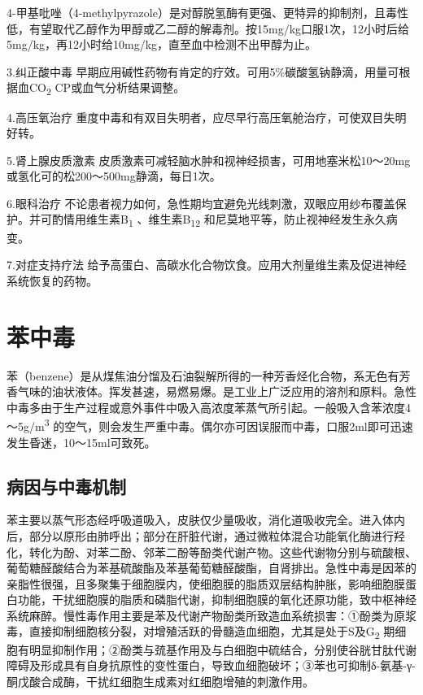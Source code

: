 4-甲基吡唑（4-methylpyrazole）是对醇脱氢酶有更强、更特异的抑制剂，且毒性低，有望取代乙醇作为甲醇或乙二醇的解毒剂。按15mg/kg口服1次，12小时后给5mg/kg，再12小时给10mg/kg，直至血中检测不出甲醇为止。

3.纠正酸中毒
早期应用碱性药物有肯定的疗效。可用5\%碳酸氢钠静滴，用量可根据血CO\textsubscript{2}
CP或血气分析结果调整。

4.高压氧治疗
重度中毒和有双目失明者，应尽早行高压氧舱治疗，可使双目失明好转。

5.肾上腺皮质激素
皮质激素可减轻脑水肿和视神经损害，可用地塞米松10～20mg或氢化可的松200～500mg静滴，每日1次。

6.眼科治疗
不论患者视力如何，急性期均宜避免光线刺激，双眼应用纱布覆盖保护。并可酌情用维生素B\textsubscript{1}
、维生素B\textsubscript{12} 和尼莫地平等，防止视神经发生永久病变。

7.对症支持疗法
给予高蛋白、高碳水化合物饮食。应用大剂量维生素及促进神经系统恢复的药物。

\protect\hypertarget{text00153.html}{}{}

\section{苯中毒}

苯（benzene）是从煤焦油分馏及石油裂解所得的一种芳香烃化合物，系无色有芳香气味的油状液体。挥发甚速，易燃易爆。是工业上广泛应用的溶剂和原料。急性中毒多由于生产过程或意外事件中吸入高浓度苯蒸气所引起。一般吸入含苯浓度4～5g/m\textsuperscript{3}
的空气，则会发生严重中毒。偶尔亦可因误服而中毒，口服2ml即可迅速发生昏迷，10～15ml可致死。

\subsection{病因与中毒机制}

苯主要以蒸气形态经呼吸道吸入，皮肤仅少量吸收，消化道吸收完全。进入体内后，部分以原形由肺呼出；部分在肝脏代谢，通过微粒体混合功能氧化酶进行羟化，转化为酚、对苯二酚、邻苯二酚等酚类代谢产物。这些代谢物分别与硫酸根、葡萄糖醛酸结合为苯基硫酸酯及苯基葡萄糖醛酸酯，自肾排出。急性中毒是因苯的亲脂性很强，且多聚集于细胞膜内，使细胞膜的脂质双层结构肿胀，影响细胞膜蛋白功能，干扰细胞膜的脂质和磷脂代谢，抑制细胞膜的氧化还原功能，致中枢神经系统麻醉。慢性毒作用主要是苯及代谢产物酚类所致造血系统损害：①酚类为原浆毒，直接抑制细胞核分裂，对增殖活跃的骨髓造血细胞，尤其是处于S及G\textsubscript{2}
期细胞有明显抑制作用；②酚类与巯基作用及与白细胞中硫结合，分别使谷胱甘肽代谢障碍及形成具有自身抗原性的变性蛋白，导致血细胞破坏；③苯也可抑制δ-氨基-γ-酮戊酸合成酶，干扰红细胞生成素对红细胞增殖的刺激作用。

